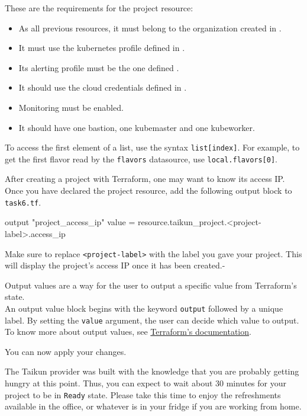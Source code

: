 These are the requirements for the project resource:
\begin{itemize}
  \item As all previous resources, it must belong to the organization created in .
  \item It must use the kubernetes profile defined in .
  \item Its alerting profile must be the one defined .
  \item It should use the cloud credentials defined in .
  \item Monitoring must be enabled.
  \item It should have one bastion, one kubemaster and one kubeworker.
\end{itemize}

\begin{tip}
  To access the first element of a list, use the syntax \texttt{list[index]}.
  For example, to get the first flavor read by the \texttt{flavors} datasource,
  use \texttt{local.flavors[0]}.
\end{tip}
\pagebreak

After creating a project with Terraform, one may want to know its access IP.
Once you have declared the project resource, add the following output block to \texttt{task6.tf}.
\begin{tf}
output "project_access_ip" {
  value = resource.taikun_project.<project-label>.access_ip
}
\end{tf}
Make sure to replace \texttt{<project-label>} with the label you gave your project.
This will display the project's access IP once it has been created.-
\begin{tip}
Output values are a way for the user to output a specific value from Terraform's state.\\

An output value block begins with the keyword \texttt{output} followed by a unique label.
By setting the \texttt{value} argument, the user can decide which value to output.\\

To know more about output values, see 
\href{https://www.terraform.io/docs/language/values/outputs.html}{Terraform's documentation}.
\end{tip}

You can now apply your changes.
\begin{hint}
  The Taikun provider was built with the knowledge that you are probably getting hungry at this point.
  Thus, you can expect to wait about 30 minutes for your project to be in \texttt{Ready} state.
  Please take this time to enjoy the refreshments available in the office, or whatever is
  in your fridge if you are working from home.
\end{hint}
